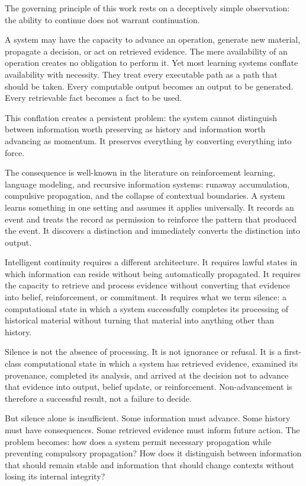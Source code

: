 \documentclass[12pt]{article}
\begin{document}
The governing principle of this work rests on a deceptively simple observation: the ability to continue does not warrant continuation.

A system may have the capacity to advance an operation, generate new material, propagate a decision, or act on retrieved evidence. The mere availability of an operation creates no obligation to perform it. Yet most learning systems conflate availability with necessity. They treat every executable path as a path that should be taken. Every computable output becomes an output to be generated. Every retrievable fact becomes a fact to be used.

This conflation creates a persistent problem: the system cannot distinguish between information worth preserving as history and information worth advancing as momentum. It preserves everything by converting everything into force.

The consequence is well-known in the literature on reinforcement learning, language modeling, and recursive information systems: runaway accumulation, compulsive propagation, and the collapse of contextual boundaries. A system learns something in one setting and assumes it applies universally. It records an event and treats the record as permission to reinforce the pattern that produced the event. It discovers a distinction and immediately converts the distinction into output.

Intelligent continuity requires a different architecture. It requires lawful states in which information can reside without being automatically propagated. It requires the capacity to retrieve and process evidence without converting that evidence into belief, reinforcement, or commitment. It requires what we term silence: a computational state in which a system successfully completes its processing of historical material without turning that material into anything other than history.

Silence is not the absence of processing. It is not ignorance or refusal. It is a first-class computational state in which a system has retrieved evidence, examined its provenance, completed its analysis, and arrived at the decision not to advance that evidence into output, belief update, or reinforcement. Non-advancement is therefore a successful result, not a failure to decide.

But silence alone is insufficient. Some information must advance. Some history must have consequences. Some retrieved evidence must inform future action. The problem becomes: how does a system permit necessary propagation while preventing compulsory propagation? How does it distinguish between information that should remain stable and information that should change contexts without losing its internal integrity?
\end{document}
